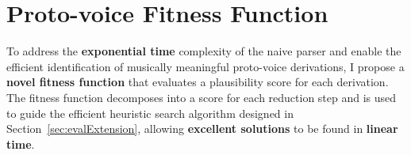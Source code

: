 \documentclass[12pt,a4paper,twoside,openany]{report} \usepackage[pdfborder={0 0 0}]{hyperref}    %
\DeclareMathOperator*{\argmax}{arg\,max} \DeclareMathOperator*{\argmin}{arg\,min}
\theoremstyle{definition} \newtheorem{definition}{Definition}[section]
\begin{document}
%
%
%
%
%

    \newpage
    \section{Proto-voice Fitness Function}
    \label{sec:extensionImplementation}

    To address the \textbf{exponential time} complexity of the naive parser and enable the efficient identification of musically
    meaningful proto-voice derivations, I propose a \textbf{novel fitness function} that evaluates a plausibility score
    for each
    derivation. The fitness function decomposes into a score for each reduction step and is used to guide the
    efficient heuristic search algorithm designed in Section~\ref{sec:evalExtension}, allowing \textbf{excellent
    solutions} to be found in \textbf{linear time}.
\end{document}
